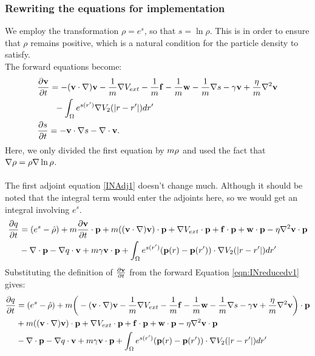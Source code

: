 \subsubsection{Rewriting the equations for implementation}
We employ the transformation $\rho = e^s$, so that $s = \ln \rho$. This is in order to ensure that $\rho$ remains positive, which is a natural condition for the particle density to satisfy.
\\
The forward equations become:
\begin{align}
& \frac{\partial \mathbf{v}}{\partial t}= -  (\mathbf{v} \cdot \nabla)\mathbf{v} - \frac{1}{m} \nabla V_{ext} -\frac{1}{m}\mathbf{f} -\frac{1}{m} \mathbf{w} - \frac{1}{m} \nabla s - \gamma \mathbf{v} +  \frac{\eta}{m} \nabla^2 \mathbf{v} \label{eqn:INreducedv1}\\
&\quad \quad  -\int_\Omega e^{s(r')} \nabla V_2(|r-r'|)dr' \notag\\
 &\frac{\partial s}{\partial t} = - \mathbf{v} \cdot \nabla s - \nabla \cdot \mathbf{v} \label{eqn:INreducedrho1} .
\end{align}
Here, we only divided the first equation by $m \rho$ and used the fact that $\nabla \rho = \rho \nabla \ln \rho$.\\
\\
The first adjoint equation \ref{INAdj1} doesn't change much. Although it should be noted that the integral term would enter the adjoints here, so we would get an integral involving $e^s$.
\begin{align*}
 \frac{\partial q}{\partial t} &= (e^s - \hat \rho) +m  \frac{\partial \mathbf{v}}{\partial t}\cdot \mathbf{p} + m ( (\mathbf{v} \cdot \nabla)\mathbf{v}) \cdot \mathbf{p}+ \nabla V_{ext}\cdot \mathbf{p} + \mathbf{f} \cdot \mathbf{p} + \mathbf{w} \cdot \mathbf{p}  - \eta \nabla^2 \mathbf{v} \cdot \mathbf{p}\\
&-\nabla\cdot \mathbf{p}  -  \nabla q \cdot \mathbf{v} + m \gamma \mathbf{v} \cdot \mathbf{p}  + \int_\Omega  e^{s(r')}(\mathbf{p}(r) - \mathbf{p}(r')) \cdot\nabla V_2(|r-r'|)   dr' \qquad 
\end{align*}
Substituting the definition of $\frac{\partial \mathbf{v}}{\partial t}$ from the forward Equation \ref{eqn:INreducedv1} gives:
\begin{align*}
 \frac{\partial q}{\partial t} &= (e^s - \hat \rho) +m  \bigg( -  (\mathbf{v} \cdot \nabla)\mathbf{v} - \frac{1}{m} \nabla V_{ext} -\frac{1}{m}\mathbf{f} -\frac{1}{m} \mathbf{w} - \frac{1}{m} \nabla s - \gamma \mathbf{v} +  \frac{\eta}{m} \nabla^2 \mathbf{v}\bigg)\cdot \mathbf{p} \\
&+ m ( (\mathbf{v} \cdot \nabla)\mathbf{v}) \cdot \mathbf{p}+ \nabla V_{ext}\cdot \mathbf{p} + \mathbf{f} \cdot \mathbf{p} + \mathbf{w} \cdot \mathbf{p}  - \eta \nabla^2 \mathbf{v} \cdot \mathbf{p} \\
&-\nabla\cdot \mathbf{p}  -  \nabla q \cdot \mathbf{v} + m \gamma \mathbf{v} \cdot \mathbf{p}   + \int_\Omega  e^{s(r')}(\mathbf{p}(r) - \mathbf{p}(r')) \cdot\nabla V_2(|r-r'|)   dr'
\end{align*}

